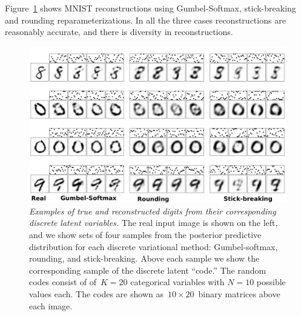    

Figure~\ref{fig:VAE} shows MNIST reconstructions using Gumbel-Softmax,
stick-breaking and rounding reparameterizations. In all the three
cases reconstructions are reasonably accurate, and there is diversity
in reconstructions.
\begin{figure}[t]
  \centering
  \includegraphics[width=5.in]{figure4.pdf} 
  \caption{\textit{Examples of true and reconstructed digits from their
    corresponding discrete latent variables.} The real input image is
    shown on the left, and we show sets of four samples from the
    posterior predictive distribution for each discrete variational
    method: Gumbel-softmax, rounding, and stick-breaking.  Above each
    sample we show the corresponding sample of the discrete latent
    ``code.''  The random codes consist of of~$K=20$ categorical
    variables with $N=10$ possible values each.  The codes are shown
    as~${10 \times 20}$~binary matrices above each image.}
\label{fig:VAE}
\end{figure}


